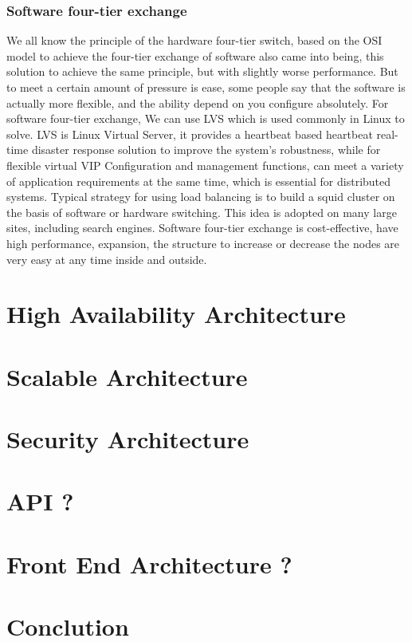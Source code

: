 \documentclass[a4paper]{article}
\begin{document}
\subsubsection{Software four-tier exchange}
We all know the principle of the hardware four-tier switch, based on the OSI model to achieve the four-tier exchange of software also came into being, this solution to achieve the same principle, but  with slightly worse performance. But to meet a certain amount of pressure is ease, some people say that the software is actually more flexible, and the ability depend on you configure absolutely. For software four-tier exchange, We can use LVS which is used commonly in Linux to solve. LVS is Linux Virtual Server, it provides a heartbeat based heartbeat real-time disaster response solution to improve the system's robustness, while for flexible virtual VIP Configuration and management functions, can meet a variety of application requirements at the same time, which is essential for distributed systems.  Typical strategy for using load balancing is to build a squid cluster on the basis of software or hardware switching. This idea is adopted on many large sites, including search engines. Software four-tier exchange is cost-effective, have high performance, expansion, the structure to increase or decrease the nodes are very easy at any time inside and outside.


\newpage
\section{High Availability Architecture}

\newpage
\section{Scalable Architecture}

\newpage
\section{Security Architecture}

\newpage
\section{API ?}

\newpage
\section{Front End Architecture ?}

\newpage
\section{Conclution}

\newpage
\listoffigures
\end{document}
